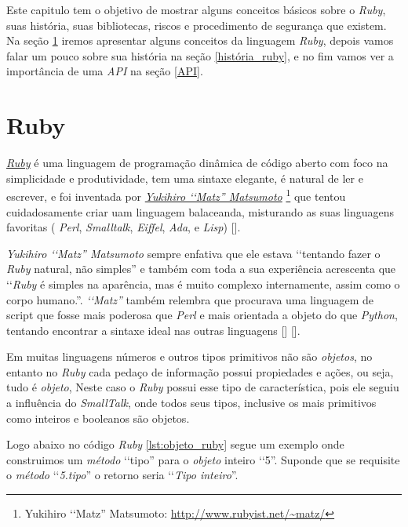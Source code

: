 Este capitulo tem o objetivo de mostrar alguns conceitos básicos sobre o \emph{Ruby}, suas
história, suas bibliotecas, riscos e procedimento de segurança que existem.
Na seção \ref{ruby} iremos apresentar alguns conceitos da linguagem \emph{Ruby},
depois vamos falar um pouco sobre sua história na seção \ref{história_ruby}, e no fim vamos ver
a importância de uma \emph{API} na seção \ref{API}.

\section{Ruby}
\label{ruby}

\emph{\href{https://www.ruby-lang.org/en/}{Ruby}} é uma linguagem de programação
dinâmica de código aberto com foco na simplicidade e produtividade, tem uma sintaxe elegante, é natural de
ler e escrever, e foi inventada por \emph{ \href{http://www.rubyist.net/~matz/}{Yukihiro ‘‘Matz'' Matsumoto}}
\footnote{Yukihiro ‘‘Matz'' Matsumoto: \url{http://www.rubyist.net/~matz/}}
que tentou cuidadosamente criar uam linguagem balaceanda, misturando as suas linguagens favoritas
( \emph{Perl}, \emph{Smalltalk}, \emph{Eiffel}, \emph{Ada}, e \emph{Lisp}) [].

\emph{{Yukihiro ‘‘Matz'' Matsumoto}} sempre enfativa que ele estava ‘‘tentando fazer o \emph{Ruby} natural, não simples'' e também com toda a
sua experiência acrescenta que ‘‘\emph{Ruby} é simples na aparência, mas é muito complexo internamente, assim
como o corpo humano.''. \emph{‘‘Matz''} também relembra que procurava uma linguagem de script que fosse mais
poderosa que \emph{Perl} e mais orientada a objeto do que \emph{Python}, tentando encontrar a
sintaxe ideal nas outras linguagens [] [].

Em muitas linguagens números e outros tipos primitivos não são \emph{objetos}, no entanto no \emph{Ruby}
cada pedaço de informação possui propiedades e ações, ou seja, tudo é \emph{objeto}, Neste caso o
\emph{Ruby} possui esse tipo de característica, pois ele seguiu a influência do \emph{SmallTalk}, onde
todos seus tipos, inclusive os mais primitivos como inteiros e booleanos são objetos.

Logo abaixo no código \emph{Ruby} \ref{lst:objeto_ruby} segue um
exemplo onde construimos um \emph{método} ‘‘tipo'' para o \emph{objeto} inteiro ‘‘5''. Suponde que se
requisite o \emph{método} ‘‘\emph{5.tipo}'' o retorno seria ‘‘\emph{Tipo inteiro}''.

